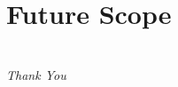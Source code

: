 \documentclass{beamer}
\begin{document}
%

\section{Future Scope}




% 





%
\section*{}
\begin{frame}{}
	\centering \Huge
	\emph{Thank You}
\end{frame}
\end{document}
